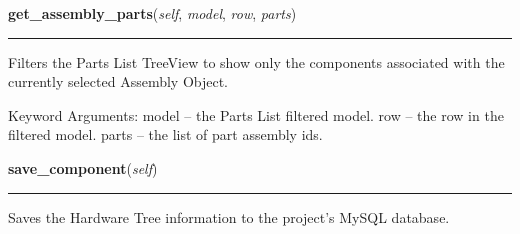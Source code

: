    \label{reliafree:partlist:PartsListWindow:get_assembly_parts}

    \vspace{0.5ex}

\hspace{.8\funcindent}\begin{boxedminipage}{\funcwidth}

    \raggedright \textbf{get\_assembly\_parts}(\textit{self}, \textit{model}, \textit{row}, \textit{parts})

    \vspace{-1.5ex}

    \rule{\textwidth}{0.5\fboxrule}
\setlength{\parskip}{2ex}
    Filters the Parts List TreeView to show only the components associated 
    with the currently selected Assembly Object.

    Keyword Arguments: model -- the Parts List filtered model. row   -- the
    row in the filtered model. parts -- the list of part assembly ids.

\setlength{\parskip}{1ex}
    \end{boxedminipage}

    \label{reliafree:partlist:PartsListWindow:save_component}

    \vspace{0.5ex}

\hspace{.8\funcindent}\begin{boxedminipage}{\funcwidth}

    \raggedright \textbf{save\_component}(\textit{self})

    \vspace{-1.5ex}

    \rule{\textwidth}{0.5\fboxrule}
\setlength{\parskip}{2ex}
    Saves the Hardware Tree information to the project's MySQL database.

\setlength{\parskip}{1ex}
    \end{boxedminipage}

    \label{reliafree:partlist:PartsListWindow:save_line_item}

